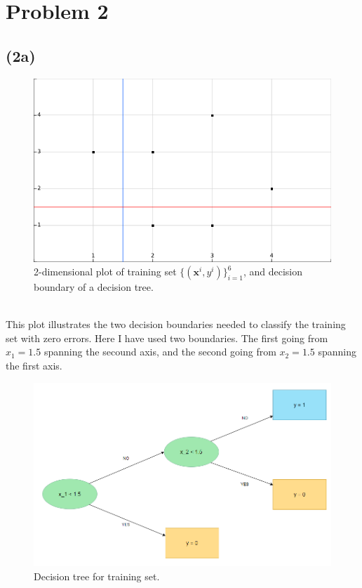 \documentclass[12pt, letterpaper]{article}
\newcommand{\mbf}{\mathbf}
\begin{document}
  \section*{Problem 2}
    \subsection*{(2a)}
      \begin{figure}[H]
        \caption{2-dimensional plot of training set $\{(\mbf{x}^i, y^i)\}_{i=1}^6$, and decision boundary of a decision tree.}
        \centering
        \includegraphics[scale=0.75]{decisionboundary_2a}
      \end{figure}\\
      This plot illustrates the two decision boundaries needed to classify the training set with zero errors. Here I have used two boundaries. The first going from $x_1 = 1.5$ spanning the secound axis, and the second going from $x_2 = 1.5$ spanning the first axis.\\
      \begin{figure}[H]
        \caption{Decision tree for training set.}
        \centering
        \includegraphics[scale=0.6]{DescisionTree}
      \end{figure}\\
\end{document}

